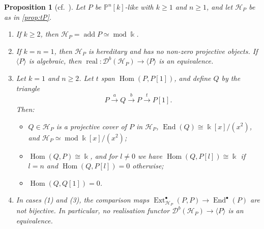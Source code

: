\documentclass[11pt,reqno]{amsart}
\theoremstyle{plain}
\newtheorem{proposition}[theorem]{Proposition}
\theoremstyle{definition}
\theoremstyle{remark}
\newcommand{\kk}{\Bbbk}
\DeclareMathOperator{\Hom}{Hom}
\DeclareMathOperator{\End}{End}
\DeclareMathOperator{\Ext}{Ext}
\DeclareMathOperator{\add}{add}
\DeclareMathOperator{\real}{real}
\newcommand{\modd}{\operatorname{mod}}
\newcommand{\Db}{\mathcal{D}^b}
\newcommand{\thick}[1]{\langle #1\rangle}
\newcommand{\Pn}[2]{\mathbb{P}^{#1}[#2]}
\newcommand{\cH}{\mathcal{H}}
\begin{document}
\begin{proposition}[{cf.\ \cite[Lemmas~3.11 and~4.15, Cor.~4.16]{Bonf26}}]\label{prop:heart-P}
Let $P$ be $\Pn nk$-like with $k\ge1$ and $n\ge1$, and let $\cH_P$ be as in \cref{prop:tP}.
\begin{enumerate}
\item If $k\ge2$, then $\cH_P=\add P\simeq\modd\kk$.
\item If $k=n=1$, then $\cH_P$ is hereditary and has no non-zero projective objects. If $\thick P$ is algebraic, then $\real\colon\Db(\cH_P)\to\thick P$ is an equivalence.
\item Let $k=1$ and $n\ge2$. Let $t$ span $\Hom(P,P[1])$, and define $Q$ by the triangle
\[P\xrightarrow{a}Q\xrightarrow{b}P\xrightarrow{t}P[1].\]
Then:
\begin{itemize}
\item $Q\in\cH_P$ is a projective cover of $P$ in $\cH_P$, $\End(Q)\cong\kk[x]/(x^2)$, and $\cH_P\simeq\modd\kk[x]/(x^2)$;
\item $\Hom(Q,P)\cong\kk$, and for $l\ne0$ we have $\Hom(Q,P[l])\cong\kk$ if $l=n$ and $\Hom(Q,P[l])=0$ otherwise;
\item $\Hom(Q,Q[1])=0$.
\end{itemize}
\item In cases \textup{(1)} and \textup{(3)}, the comparison maps $\Ext^\bullet_{\cH_P}(P,P)\to\End^\bullet(P)$ are not bijective. In particular, no realisation functor $\Db(\cH_P)\to\thick P$ is an equivalence.
\end{enumerate}
\end{proposition}
\end{document}
